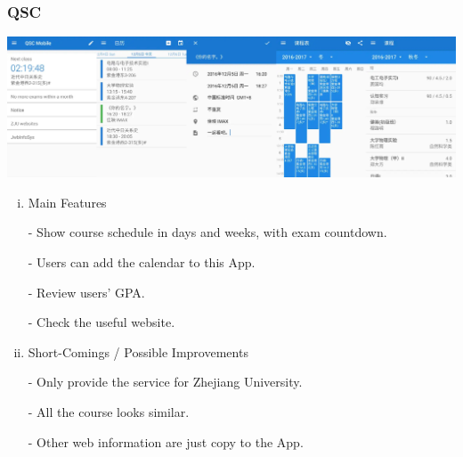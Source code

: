 \documentclass{article}
\begin{document}
    \subsubsection{QSC}
    \begin{center}
        \includegraphics[width=6.9in]{QSC}
    \end{center}
    \begin{enumerate}[i)]

    \item Main Features

    - Show course schedule in days and weeks, with exam countdown.

    - Users can add the calendar to this App.

    - Review users' GPA.

    - Check the useful website.

    \item Short-Comings / Possible Improvements
    
    - Only provide the service for Zhejiang University.
    
    - All the course looks similar.

    - Other web information are just copy to the App.

    \end{enumerate}
    
\end{document}
